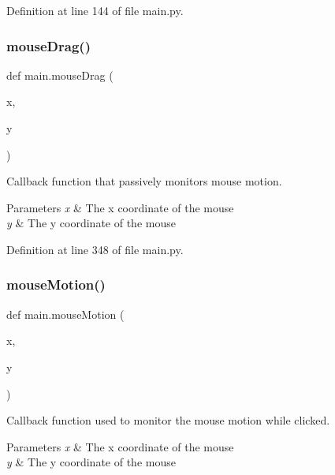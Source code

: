 Definition at line 144 of file main.\+py.

\mbox{\label{namespacemain_a33eac5e1e174927a801f847ff8c2d484}} 
\subsubsection{\texorpdfstring{mouse\+Drag()}{mouseDrag()}}
{\footnotesize\ttfamily def main.\+mouse\+Drag (\begin{DoxyParamCaption}\item[{}]{x,  }\item[{}]{y }\end{DoxyParamCaption})}



Callback function that passively monitors mouse motion. 


\begin{DoxyParams}{Parameters}
{\em x} & The x coordinate of the mouse \\
\hline
{\em y} & The y coordinate of the mouse \\
\hline
\end{DoxyParams}


Definition at line 348 of file main.\+py.

\mbox{\label{namespacemain_aac29b4e8c9fa3c64c062e76290492fb8}} 
\subsubsection{\texorpdfstring{mouse\+Motion()}{mouseMotion()}}
{\footnotesize\ttfamily def main.\+mouse\+Motion (\begin{DoxyParamCaption}\item[{}]{x,  }\item[{}]{y }\end{DoxyParamCaption})}



Callback function used to monitor the mouse motion while clicked. 


\begin{DoxyParams}{Parameters}
{\em x} & The x coordinate of the mouse \\
\hline
{\em y} & The y coordinate of the mouse \\
\hline
\end{DoxyParams}


